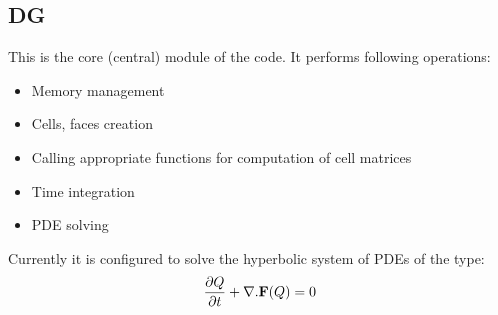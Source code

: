 \subsection{DG}
This is the core (central) module of the code. It performs following operations:
\begin{itemize}
	\item Memory management 
	\item Cells, faces creation 
	\item Calling appropriate functions for computation of cell matrices
	\item Time integration
	\item PDE solving
\end{itemize}

Currently it is configured to solve the hyperbolic system of PDEs of the type:
\begin{equation}
	\frac{\partial {Q}}{\partial{t}} + \nabla .  {\bf F}(Q) = 0
\end{equation}

